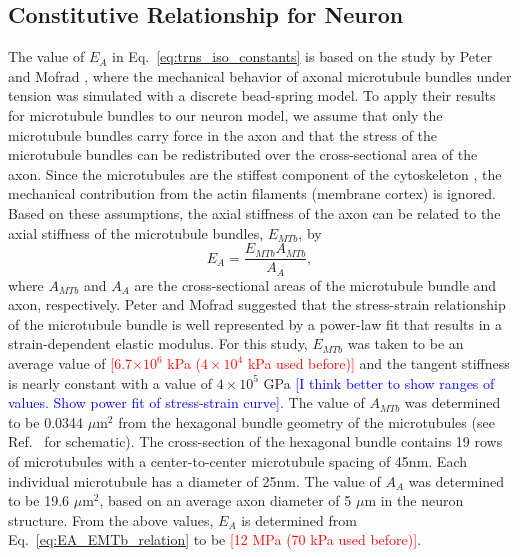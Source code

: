 \documentclass[]{interact}
\newcommand{\blue}[1]{\textcolor{blue}{[#1]}}
\newcommand{\red}[1]{\textcolor{red}{[#1]}}
\begin{document}
\subsection{Constitutive Relationship for Neuron}

The value of $E_A$ in Eq.\ \eqref{eq:trns_iso_constants} is based on the study by Peter and Mofrad \citep{Peter:2012fc}, where the mechanical behavior of axonal microtubule bundles under tension was simulated with a discrete bead-spring model. To apply their results for microtubule bundles to our neuron model, we assume that only the microtubule bundles carry force in the axon and that the stress of the microtubule bundles can be redistributed over the cross-sectional area of the axon. Since the microtubules are the stiffest component of the cytoskeleton \citep{Fletcher:2010ku}, the mechanical contribution from the actin filaments (membrane cortex) is ignored. Based on these assumptions, the axial stiffness of the axon can be related to the axial stiffness of the microtubule bundles, $E_{MTb}$, by
%
\begin{equation}
E_A = \frac{E_{MTb} A_{MTb}}{A_A},
\label{eq:EA_EMTb_relation}
\end{equation}
%
where $A_{MTb}$ and $A_A$ are the cross-sectional areas of the microtubule bundle and axon, respectively. Peter and Mofrad \citep{Peter:2012fc} suggested that the stress-strain relationship of the microtubule bundle is well represented by a power-law fit that results in a strain-dependent elastic modulus. For this study, $E_{MTb}$ was taken to be an average value of \red{6.7$\times10^6$ kPa ($4\times 10^{4}$ kPa used before)} and the tangent stiffness is nearly constant with a value of $4\times10^5$ GPa \blue{I think better to show ranges of values. Show power fit of stress-strain curve}. The value of $A_{MTb}$ was determined to be 0.0344 $\mu$m${}^2$ from the hexagonal bundle geometry of the microtubules (see Ref.\ \citep{Peter:2012fc} for schematic). The cross-section of the hexagonal bundle contains 19 rows of microtubules with a center-to-center microtubule spacing of 45nm. Each  individual microtubule has a diameter of 25nm. The value of $A_A$ was determined to be 19.6 $\mu$m${}^2$, based on an average axon diameter of 5 $\mu$m in the neuron structure. From the above values, $E_A$ is determined from Eq.\ \eqref{eq:EA_EMTb_relation} to be \red{12 MPa (70 kPa used before)}. 
\end{document}

